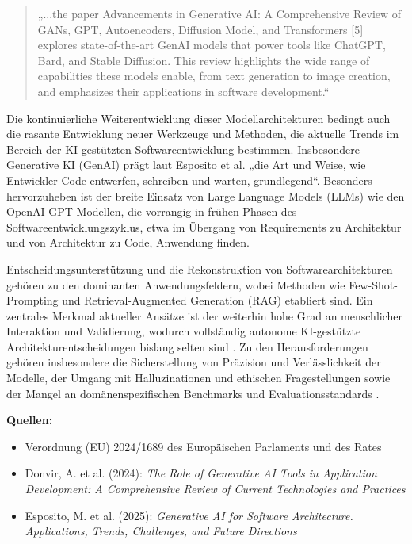 \begin{quote}
    „...the paper Advancements in Generative AI: A Comprehensive Review of GANs, GPT, Autoencoders, Diffusion Model, and Transformers [5] explores state-of-the-art GenAI models that power tools like ChatGPT, Bard, and Stable Diffusion. This review highlights the wide range of capabilities these models enable, from text generation to image creation, and emphasizes their applications in software development.“
\end{quote}
\cite[S.~2]{donvir_role_2024}

Die kontinuierliche Weiterentwicklung dieser Modellarchitekturen bedingt auch
die rasante Entwicklung neuer Werkzeuge und Methoden, die aktuelle Trends im
Bereich der KI-gestützten Softwareentwicklung bestimmen. Insbesondere
Generative KI (GenAI) prägt laut Esposito et al.
\cite{esposito_generative_2025} „die Art und Weise, wie Entwickler Code
entwerfen, schreiben und warten, grundlegend“. Besonders hervorzuheben ist der
breite Einsatz von Large Language Models (LLMs) wie den OpenAI GPT-Modellen,
die vorrangig in frühen Phasen des Softwareentwicklungszyklus, etwa im Übergang
von Requirements zu Architektur und von Architektur zu Code, Anwendung finden.

Entscheidungsunterstützung und die Rekonstruktion von Softwarearchitekturen
gehören zu den dominanten Anwendungsfeldern, wobei Methoden wie
Few-Shot-Prompting und Retrieval-Augmented Generation (RAG) etabliert sind. Ein
zentrales Merkmal aktueller Ansätze ist der weiterhin hohe Grad an menschlicher
Interaktion und Validierung, wodurch vollständig autonome KI-gestützte
Architekturentscheidungen bislang selten sind
\cite[S.~2,~10]{esposito_generative_2025}. Zu den Herausforderungen gehören
insbesondere die Sicherstellung von Präzision und Verlässlichkeit der Modelle,
der Umgang mit Halluzinationen und ethischen Fragestellungen sowie der Mangel
an domänenspezifischen Benchmarks und Evaluationsstandards
\cite[S.~2,~16]{esposito_generative_2025}.

\vspace{1em}
\noindent
\textbf{Quellen:}
\begin{itemize}
    \item Verordnung (EU) 2024/1689 des Europäischen Parlaments und des Rates
          \cite{noauthor_verordnung_nodate}
    \item Donvir, A. et al. (2024): \textit{The Role of Generative AI Tools in
              Application Development: A Comprehensive Review of Current Technologies and
              Practices} \cite{donvir_role_2024}
    \item Esposito, M. et al. (2025): \textit{Generative AI for Software Architecture.
              Applications, Trends, Challenges, and Future Directions}
          \cite{esposito_generative_2025}
\end{itemize}

